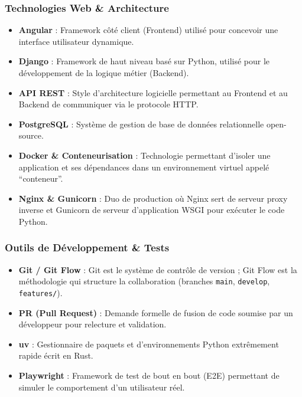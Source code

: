 \hypertarget{technologies-web-architecture}{%
\subsubsection{Technologies Web \&
Architecture}\label{technologies-web-architecture}}

\begin{itemize}
\tightlist
\item
  \textbf{Angular} : Framework côté client (Frontend) utilisé pour
  concevoir une interface utilisateur dynamique.
\item
  \textbf{Django} : Framework de haut niveau basé sur Python, utilisé
  pour le développement de la logique métier (Backend).
\item
  \textbf{API REST} : Style d'architecture logicielle permettant au
  Frontend et au Backend de communiquer via le protocole HTTP.
\item
  \textbf{PostgreSQL} : Système de gestion de base de données
  relationnelle open-source.
\item
  \textbf{Docker \& Conteneurisation} : Technologie permettant d'isoler
  une application et ses dépendances dans un environnement virtuel
  appelé ``conteneur''.
\item
  \textbf{Nginx \& Gunicorn} : Duo de production où Nginx sert de
  serveur proxy inverse et Gunicorn de serveur d'application WSGI pour
  exécuter le code Python.
\end{itemize}

\hypertarget{outils-de-duxe9veloppement-tests}{%
\subsubsection{Outils de Développement \&
Tests}\label{outils-de-duxe9veloppement-tests}}

\begin{itemize}
\tightlist
\item
  \textbf{Git / Git Flow} : Git est le système de contrôle de version ;
  Git Flow est la méthodologie qui structure la collaboration (branches
  \texttt{main}, \texttt{develop}, \texttt{features/}).
\item
  \textbf{PR (Pull Request)} : Demande formelle de fusion de code
  soumise par un développeur pour relecture et validation.
\item
  \textbf{uv} : Gestionnaire de paquets et d'environnements Python
  extrêmement rapide écrit en Rust.
\item
  \textbf{Playwright} : Framework de test de bout en bout (E2E)
  permettant de simuler le comportement d'un utilisateur réel.
\end{itemize}

